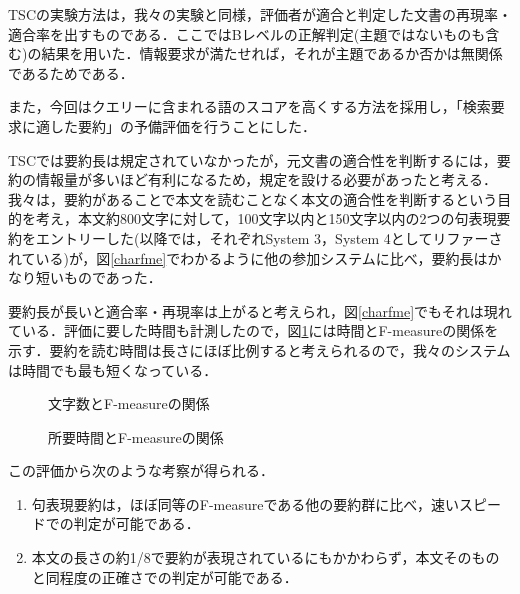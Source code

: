 TSCの実験方法は，我々の実験と同様，評価者が適合と判定した文書の再現率・適合率を出すものである．ここではBレベルの正解判定(主題ではないものも含む)の結果を用いた．情報要求が満たせれば，それが主題であるか否かは無関係であるためである．

また，今回はクエリーに含まれる語のスコアを高くする方法を採用し，「検索要求に適した要約」の予備評価を行うことにした．

TSCでは要約長は規定されていなかったが，元文書の適合性を判断するには，要約の情報量が多いほど有利になるため，規定を設ける必要があったと考える．我々は，要約があることで本文を読むことなく本文の適合性を判断するという目的を考え，本文約800文字に対して，100文字以内と150文字以内の2つの句表現要約をエントリーした(以降では，それぞれSystem 3，System 4としてリファーされている)が，図\ref{charfme}でわかるように他の参加システムに比べ，要約長はかなり短いものであった．


要約長が長いと適合率・再現率は上がると考えられ，図\ref{charfme}でもそれは現れている．評価に要した時間も計測したので，図\ref{timefme}には時間とF-measureの関係を示す．要約を読む時間は長さにほぼ比例すると考えられるので，我々のシステムは時間でも最も短くなっている．

\begin{figure}[htbp]
\vspace{2em}
\begin{center}
 \begin{minipage}{0.53\textwidth}
  \begin{center}
    \caption{文字数とF-measureの関係}
    \label{charfme}
  \end{center}
 \end{minipage}
 \begin{minipage}{0.47\textwidth}
  \begin{center}
    \caption{所要時間とF-measureの関係}
    \label{timefme}
  \end{center}
 \end{minipage}
\end{center}
\vspace*{1em}
\end{figure}

この評価から次のような考察が得られる．
\begin{enumerate}
 \item 句表現要約は，ほぼ同等のF-measureである他の要約群に比べ，速いスピードでの判定が可能である．
 \item 本文の長さの約1/8で要約が表現されているにもかかわらず，本文そのものと同程度の正確さでの判定が可能である．
\end{enumerate}


